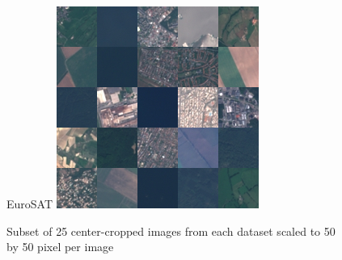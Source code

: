 \begin{figure}[H]
\begin{minipage}{0.25\textwidth}
    \end{minipage}
    \begin{minipage}{0.25\textwidth}
        \centering
        EuroSAT 
        \includegraphics[width=\textwidth]{img/ds-eurosat.png}
    \end{minipage}
    
    \caption{Subset of 25 center-cropped images from each dataset scaled to 50 by 50 pixel per image}
    \label{fig:ds-comp}
\end{figure}
